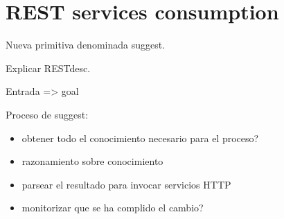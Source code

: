 
\section{REST services consumption}

Nueva primitiva denominada suggest.

Explicar RESTdesc.

Entrada => goal

Proceso de suggest:

\begin{itemize}
 \item obtener todo el conocimiento necesario para el proceso?
 \item razonamiento sobre conocimiento
 \item parsear el resultado para invocar servicios HTTP
 \item monitorizar que se ha complido el cambio?
\end{itemize}